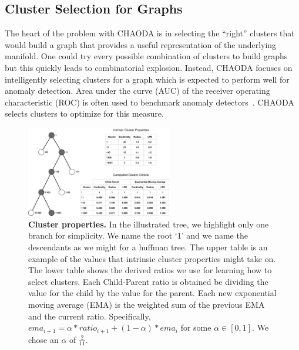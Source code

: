 \subsection{Cluster Selection for Graphs}
\label{subsec:methods:cluster-selection-for-graphs}

The heart of the problem with CHAODA is in selecting the ``right'' clusters that would build a graph that provides a useful representation of the underlying manifold.
One could try every possible combination of clusters to build graphs but this quickly leads to combinatorial explosion.
Instead, CHAODA focuses on intelligently selecting clusters for a graph which is expected to perform well for anomaly detection.
Area under the curve (AUC) of the receiver operating characteristic (ROC) is often used to benchmark anomaly detectors~\cite{fawcett2006introduction}.
CHAODA selects clusters to optimize for this measure.

\begin{figure}[ht!]
    \centering
    \includegraphics[width=2.5in]{images/chaoda-cluster-properties.pdf}
    \caption{
        \textbf{Cluster properties.}
        In the illustrated tree, we highlight only one branch for simplicity.
        We name the root `1' and we name the descendants as we might for a huffman tree.
        The upper table is an example of the values that intrinsic cluster properties might take on.
        The lower table shows the derived ratios we use for learning how to select clusters.
        Each Child-Parent ratio is obtained be dividing the value for the child by the value for the parent.
        Each new exponential moving average (EMA) is the weighted sum of the previous EMA and the current ratio.
        Specifically, $ema_{i+1} = \alpha * ratio_{i + 1} + (1 - \alpha) * ema_i$ for some $\alpha \in [0, 1]$.
        We chose an $\alpha$ of $\frac{2}{11}$.
    }
    \label{fig:methods:cluster-properties}
\end{figure}

